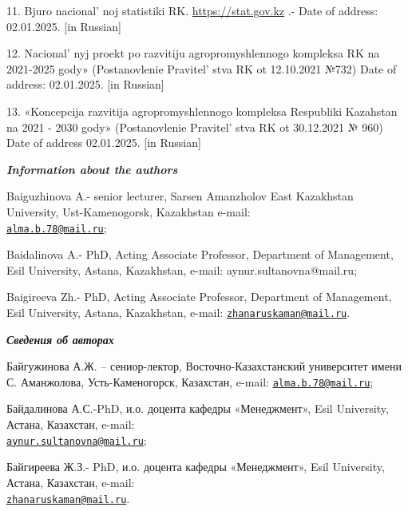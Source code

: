 \begin{references}
11. Bjuro nacional' noj statistiki RK.
\href{https://stat.gov.kz/en/}{https://stat.gov.kz} .- Date of address: 02.01.2025. {[}in Russian{]}

12. Nacional' nyj proekt po razvitiju agropromyshlennogo
kompleksa RK na 2021-2025 gody» (Postanov\-lenie
Pravitel' stva RK ot 12.10.2021 №732) Date of address:
02.01.2025. {[}in Russian{]}

13. «Koncepcija razvitija agropromyshlennogo kompleksa Respubliki
Kazahstan na 2021 - 2030 gody» (Postanovlenie
Pravitel' stva RK ot 30.12.2021 № 960) Date of address
02.01.2025. {[}in Russian{]}
\end{references}

\begin{authorinfo}
\hspace{1em}\emph{{\bfseries Information about the authors}}

Baiguzhinova A.- senior lecturer, Sarsen Amanzholov East Kazakhstan
University, Ust-Kamenogorsk, Kazakhstan e-mail:\\
\href{mailto:alma.b.78@mail.ru}{\nolinkurl{alma.b.78@mail.ru}};

Baidalinova A.- PhD, Acting Associate Professor, Department of
Management, Esil University, Astana, Kazakhstan, e-mail:
aynur.sultanovna@mail.ru;

Baigireeva Zh.- PhD, Acting Associate Professor, Department of
Management, Esil University, Astana, Kazakhstan, e-mail:
\href{mailto:zhanaruskaman@mail.ru}{\nolinkurl{zhanaruskaman@mail.ru}}.

\hspace{1em}\emph{{\bfseries Сведения об авторах}}

Байгужинова А.Ж. -- сениор-лектор, Восточно-Казахстанский университет
имени С. Аманжолова, Усть-Каменогорск, Казахстан, e-mail:
\href{mailto:alma.b.78@mail.ru}{\nolinkurl{alma.b.78@mail.ru}};

Байдалинова А.С.-PhD, и.о. доцента кафедры «Менеджмент», Esil
University, Астана, Казахстан, e-mail:\\
\href{mailto:aynur.sultanovna@mail.ru}{\nolinkurl{aynur.sultanovna@mail.ru}};

Байгиреева Ж.З.- PhD, и.о. доцента кафедры «Менеджмент», Esil
University, Астана, Казахстан, e-mail:\\
\href{mailto:zhanaruskaman@mail.ru}{\nolinkurl{zhanaruskaman@mail.ru}}.
\end{authorinfo}
